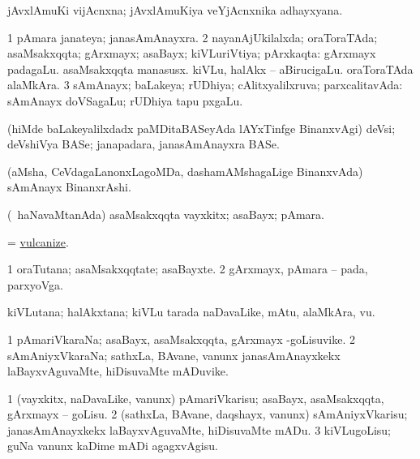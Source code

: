 \bentry
{} 
\gl{\nA}
\expl{}
\bmng
 jAvxlAmuKi vijAcnxna; jAvxlAmuKiya veYjAcnxnika adhayxyana. 
\emng
\eentry

\bentry
{} 
\gl{\gu}
\expl{}
\bmng
\bnum
\num{1} pAmara janateya; janasAmAnayxra. 
\num{2} nayanAjUkilalxda; oraToraTAda; asaMsakxqqta; gArxmayx; asaBayx; kiVLuriVtiya; pArxkaqta:  gArxmayx padagaLu.  asaMsakxqqta manasusx.  kiVLu, halAkx -- aBirucigaLu.  oraToraTAda alaMkAra. 
\num{3} sAmAnayx; baLakeya; rUDhiya; cAlitxyalilxruva; parxcalitavAda:  sAmAnayx doVSagaLu; rUDhiya tapu pxgaLu. 
\enum
\emng

\noindent 
\gl{\pagu}
\expl{}
\bmng
  (hiMde baLakeyalilxdadx paMDitaBASeyAda lAYxTinfge BinanxvAgi) deVsi; deVshiVya BASe; janapadara, janasAmAnayxra BASe. 
\emng
\eentry

\bentry
{}
\gl{\nA}
\expl{}
\bmng
 (aMsha, CeVdagaLanonxLagoMDa, dashamAMshagaLige BinanxvAda) sAmAnayx BinanxrAshi. 
\emng
\eentry

\bentry
{} 
\gl{\nA}
\expl{}
\bmng
 (\kanmu\ haNavaMtanAda) asaMsakxqqta vayxkitx; asaBayx; pAmara. 
\emng
\eentry

\bentry
{} 
\gl{\sakirx}
\expl{}
\bmng
 = \hyperlink{vulcanize}{vulcanize}. 
\emng
\eentry

\bentry
{} 
\gl{\nA}
\expl{}
\bmng
\bnum
\num{1} oraTutana; asaMsakxqqtate; asaBayxte. 
\num{2} gArxmayx, pAmara -- pada, parxyoVga. 
\enum
\emng
\eentry

\bentry 
{} 
\gl{\nA}
\bmng
 kiVLutana; halAkxtana; kiVLu tarada naDavaLike, mAtu, alaMkAra, \mo vu. 
\emng
\eentry

\bentry 
{} 
\gl{\nA}
\expl{}
\bmng
\bnum
\num{1} pAmariVkaraNa; asaBayx, asaMsakxqqta, gArxmayx -goLisuvike. 
\num{2} sAmAniyxVkaraNa; sathxLa, BAvane, \mo vanunx janasAmAnayxkekx laBayxvAguvaMte, hiDisuvaMte mADuvike. 
\enum
\emng
\eentry

\bentry 
{} 
\gl{\sakirx}
\expl{}
\bmng
\bnum
\num{1} (vayxkitx, naDavaLike, \mo vanunx) pAmariVkarisu; asaBayx, asaMsakxqqta, gArxmayx -- goLisu. 
\num{2} (sathxLa, BAvane, daqshayx, \mo vanunx) sAmAniyxVkarisu; janasAmAnayxkekx laBayxvAguvaMte, hiDisuvaMte mADu. 
\num{3} kiVLugoLisu; guNa \mo vanunx kaDime mADi agagxvAgisu. 
\enum
\emng
\eentry

